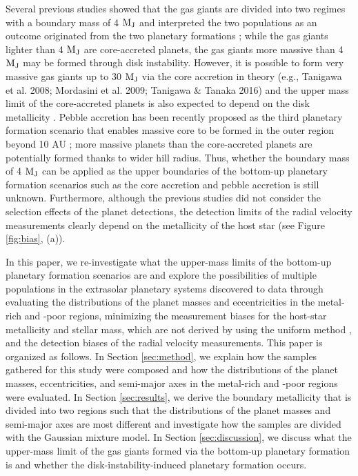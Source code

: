 \documentclass[twocolumn, dvipdfmx]{aastex62}
\begin{document}
\begin{CJK*}{UTF8}{min}
Several previous studies showed that the gas giants are divided into two regimes with a boundary mass of 4 $\rm M_J$ and interpreted the two populations as an outcome originated from the two planetary formations \citep{2007A&A...464..779R, 2017A&A...603A..30S, 2018ApJ...853...37S}; while the gas giants lighter than 4 $\rm M_J$ are core-accreted planets, the gas giants more massive than 4 $\rm M_J$ may be formed through disk instability. However, it is possible to form very massive gas giants up to 30 $\rm M_J$ via the core accretion in theory \citep[e.g.,][]{2016ApJ...823...48T}(e.g., Tanigawa et al. 2008; Mordasini et al. 2009; Tanigawa \& Tanaka 2016) and the upper mass limit of the core-accreted planets is also expected to depend on the disk metallicity \citep{2012A&A...541A..97M}. Pebble accretion has been recently proposed as the third planetary formation scenario that enables massive core to be formed in the outer region beyond 10 AU \citep{2010A&A...520A..43O, 2012A&A...544A..32L}; more massive planets than the core-accreted planets are potentially formed thanks to wider hill radius. Thus, whether the boundary mass of 4 $\rm M_J$ can be applied as the upper boundaries of the bottom-up planetary formation scenarios such as the core accretion and pebble accretion is still unknown. Furthermore, although the previous studies did not consider the selection effects of the planet detections, the detection limits of the radial velocity measurements clearly depend on the metallicity of the host star (see Figure \ref{fig:bias}, (a)). 

In this paper, we re-investigate what the upper-mass limits of the bottom-up planetary formation scenarios are and explore the possibilities of multiple populations in the extrasolar planetary systems discovered to data through evaluating the distributions of the planet masses and eccentricities in the metal-rich and -poor regions, minimizing the measurement biases for the host-star metallicity and stellar mass, which are not derived by using the uniform method \citep[e.g.,][]{2004A&A...415.1153S, 2008A&A...487..373S}, and the detection biases of the radial velocity measurements. This paper is organized as follows. In Section \ref{sec:method}, we explain how the samples gathered for this study were composed and how the distributions of the planet masses, eccentricities, and semi-major axes in the metal-rich and -poor regions were evaluated. In Section \ref{sec:results}, we derive the boundary metallicity that is divided into two regions such that the distributions of the planet masses and semi-major axes are most different and investigate how the samples are divided with the Gaussian mixture model. In Section \ref{sec:discussion}, we discuss what the upper-mass limit of the gas giants formed via the bottom-up planetary formation is and whether the disk-instability-induced planetary formation occurs.



\end{CJK*}
\end{document}
